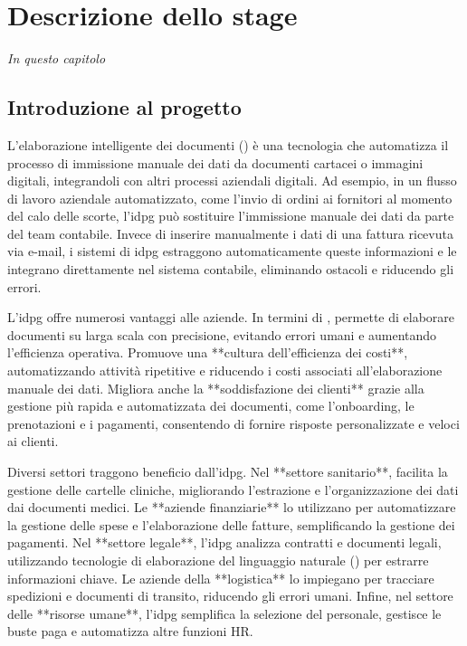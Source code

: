 
\chapter{Descrizione dello stage}
\label{cap:descrizione-stage}

\emph{In questo capitolo}

\section{Introduzione al progetto}

L'elaborazione intelligente dei documenti () è una tecnologia che automatizza il processo di immissione manuale dei dati da documenti cartacei o immagini digitali, integrandoli con altri processi aziendali digitali. Ad esempio, in un flusso di lavoro aziendale automatizzato, come l'invio di ordini ai fornitori al momento del calo delle scorte, l'\gls{idpg} può sostituire l'immissione manuale dei dati da parte del team contabile. Invece di inserire manualmente i dati di una fattura ricevuta via e-mail, i sistemi di \gls{idpg} estraggono automaticamente queste informazioni e le integrano direttamente nel sistema contabile, eliminando ostacoli e riducendo gli errori.

L'\gls{idpg} offre numerosi vantaggi alle aziende. In termini di , permette di elaborare documenti su larga scala con precisione, evitando errori umani e aumentando l'efficienza operativa. Promuove una **cultura dell’efficienza dei costi**, automatizzando attività ripetitive e riducendo i costi associati all'elaborazione manuale dei dati. Migliora anche la **soddisfazione dei clienti** grazie alla gestione più rapida e automatizzata dei documenti, come l'onboarding, le prenotazioni e i pagamenti, consentendo di fornire risposte personalizzate e veloci ai clienti.

Diversi settori traggono beneficio dall'\gls{idpg}. Nel **settore sanitario**, facilita la gestione delle cartelle cliniche, migliorando l'estrazione e l'organizzazione dei dati dai documenti medici. Le **aziende finanziarie** lo utilizzano per automatizzare la gestione delle spese e l'elaborazione delle fatture, semplificando la gestione dei pagamenti. Nel **settore legale**, l'\gls{idpg} analizza contratti e documenti legali, utilizzando tecnologie di elaborazione del linguaggio naturale () per estrarre informazioni chiave. Le aziende della **logistica** lo impiegano per tracciare spedizioni e documenti di transito, riducendo gli errori umani. Infine, nel settore delle **risorse umane**, l'\gls{idpg} semplifica la selezione del personale, gestisce le buste paga e automatizza altre funzioni HR.


